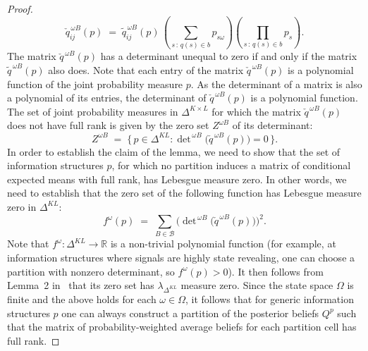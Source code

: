 \documentclass[12pt,reqno]{amsart}
\begin{document}
\begin{proof}
\[
  \check q^{\,\omega B}_{ij}(p)
  \;=\;
  \tilde q^{\,\omega B}_{ij}(p)\,
  \left(\sum_{s \,:\, q(s)\in b} p_{s\omega}\right)
  \left(\prod_{s \,:\, q(s)\in b} p_s\right).
\]
\noindent
The matrix $\check q^{\,\omega B}(p)$ has a determinant unequal to zero if and only if the matrix
$\tilde q^{\,\omega B}(p)$ also does. Note that each entry of the matrix $\check q^{\,\omega B}(p)$
is a polynomial function of the joint probability measure $p$. As the determinant of a matrix is
also a polynomial of its entries, the determinant of $\check q^{\,\omega B}(p)$ is a polynomial
function. The set of joint probability measures in $\Delta^{K\times L}$ for which the matrix
$\check q^{\,\omega B}(p)$ does not have full rank is given by the zero set $Z^{\omega B}$ of its
determinant:
\[
  Z^{\omega B} \;=\; \{\, p \in \Delta^{KL} : \det\nolimits^{\,\omega B}\!\big(\check q^{\,\omega B}(p)\big)=0 \,\}.
\]
\noindent
In order to establish the claim of the lemma, we need to show that the set of information
structures $p$, for which no partition induces a matrix of conditional expected means with full
rank, has Lebesgue measure zero. In other words, we need to establish that the zero set of the
following function has Lebesgue measure zero in $\Delta^{KL}$:
\[
  f^{\omega}(p)
  \;=\;
  \sum_{B \in \mathcal{B}}
  \Big(\det\nolimits^{\,\omega B}\!\big(\check q^{\,\omega B}(p)\big)\Big)^{2}.
\]
\noindent
Note that $f^{\omega} : \Delta^{KL} \to \mathbb{R}$ is a non-trivial polynomial function (for example, at information structures where signals are highly state revealing, one can choose a partition with nonzero determinant, so $f^\omega(p)>0$).
It then follows from Lemma~2 in~\cite{MMFJET2014} that its zero set has
$\lambda_{\Delta^{KL}}$ measure zero. Since the state space $\Omega$ is finite and the above holds for each $\omega \in \Omega$, it follows that for generic information structures $p$ one can always construct a partition of the posterior beliefs $Q^p$ such that the matrix of probability-weighted average beliefs for each partition cell has full rank.
\end{proof}
\end{document}
